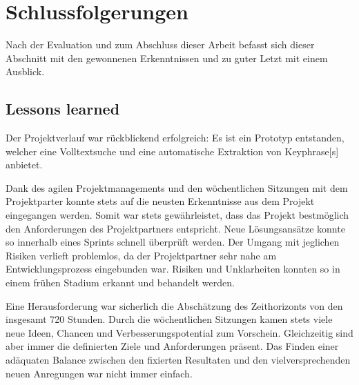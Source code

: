 
\chapter{Schlussfolgerungen}

Nach der Evaluation und zum Abschluss dieser Arbeit befasst sich dieser Abschnitt mit den gewonnenen Erkenntnissen und zu guter Letzt mit einem Ausblick. 




\section{Lessons learned} %
Der Projektverlauf war rückblickend erfolgreich: Es ist ein Prototyp entstanden, welcher eine Volltextsuche und eine automatische Extraktion von \gls{Keyphrase}[s] anbietet. 

Dank des agilen Projektmanagements und den wöchentlichen Sitzungen mit dem Projektparter konnte stets auf die neusten Erkenntnisse aus dem Projekt eingegangen werden. Somit war stets gewährleistet, dass das Projekt bestmöglich den Anforderungen des Projektpartners entspricht. Neue Lösungsansätze konnte so innerhalb eines Sprints schnell überprüft werden. Der Umgang mit jeglichen Risiken verlieft problemlos, da der Projektpartner sehr nahe am Entwicklungsprozess eingebunden war. Risiken und Unklarheiten konnten so in einem frühen Stadium erkannt und behandelt werden.

Eine Herausforderung war sicherlich die Abschätzung des Zeithorizonts von den insgesamt 720 Stunden. Durch die wöchentlichen Sitzungen kamen stets viele neue Ideen, Chancen und Verbesserungspotential zum Vorschein. Gleichzeitig sind aber immer die definierten Ziele und Anforderungen präsent. Das Finden einer adäquaten Balance zwischen den fixierten Resultaten und den vielversprechenden neuen Anregungen war nicht immer einfach.

